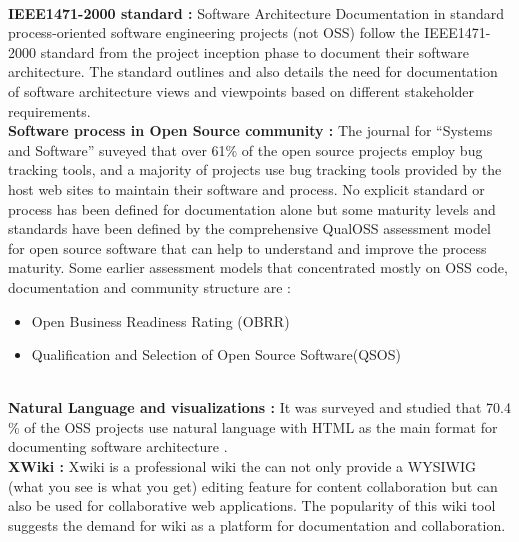 \newline
\\\indent \textbf{IEEE1471-2000 standard : }Software Architecture Documentation in standard process-oriented software engineering projects (not OSS) follow the IEEE1471-2000 standard \cite{BachmannDocumentingSoftware2010} from the project inception phase to document their software architecture. The standard outlines and also details the need for documentation of software architecture views and viewpoints based on different stakeholder requirements.
\newline
\\\indent \textbf{Software process in Open Source community : } The journal for \enquote{Systems and Software} \cite{Zhao2003} suveyed that over 61\% of the open source projects employ bug tracking tools, and a majority of projects use bug tracking tools provided by the host web sites to maintain their software and process. No explicit standard or process has been defined for documentation alone but some maturity levels and standards have been defined by the comprehensive QualOSS assessment model \cite{5314237}for open source software that can help to understand and improve the process maturity. Some earlier assessment models that concentrated mostly on OSS code, documentation and community structure are :
\begin{itemize}
\item Open Business Readiness Rating (OBRR)\cite{Golden2006}
\item Qualification and Selection of Open Source Software(QSOS)  \cite{qsos}
\end{itemize}
\indent 
\\\indent \textbf{Natural Language and visualizations : } It was surveyed and studied that 70.4 \% of the OSS projects use natural language with HTML as the main format for documenting software architecture \cite{6923128}. 
\newline
\\\indent \textbf{XWiki : } Xwiki \cite{Xwiki_Massol_2014} is a professional wiki the can not only provide a WYSIWIG (what you see is what you get) editing feature for content collaboration but can also be used for collaborative web applications. The popularity of this wiki tool suggests the demand for wiki as a platform for documentation and collaboration.

